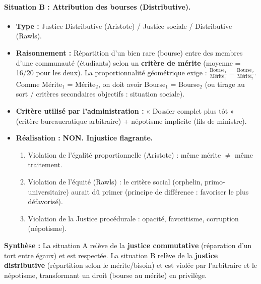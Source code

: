 \documentclass[11pt]{article}
\newcommand{\cle}[1]{{\popxbold\color{popdark}#1}}
\begin{document}
\begin{exoresolu}
    \paragraph{Situation B : Attribution des bourses (Distributive).}
    \begin{itemize}
        \item \textbf{Type :} \cle{Justice Distributive} (Aristote) / \cle{Justice sociale / Distributive} (Rawls).
        \item \textbf{Raisonnement :} Répartition d'un bien rare (bourse) entre des membres d'une communauté (étudiants) selon un \textbf{critère de mérite} (moyenne = 16/20 pour les deux). La proportionnalité géométrique exige : $\frac{\text{Bourse}_1}{\text{Mérite}_1} = \frac{\text{Bourse}_2}{\text{Mérite}_2}$. Comme Mérite$_1$ = Mérite$_2$, on doit avoir Bourse$_1$ = Bourse$_2$ (ou tirage au sort / critères secondaires objectifs : situation sociale).
        \item \textbf{Critère utilisé par l'administration :} « Dossier complet plus tôt » (critère bureaucratique arbitraire) + népotisme implicite (fils de ministre).
        \item \textbf{Réalisation :} \textbf{NON. Injustice flagrante.}
            \begin{enumerate}
                \item Violation de l'\cle{égalité proportionnelle} (Aristote) : même mérite $\neq$ même traitement.
                \item Violation de l'\cle{équité} (Rawls) : le critère social (orphelin, primo-universitaire) aurait dû primer (principe de différence : favoriser le plus défavorisé).
                \item Violation de la \cle{Justice procédurale} : opacité, favoritisme, corruption (népotisme).
            \end{enumerate}
    \end{itemize}
    \textbf{Synthèse :} La situation A relève de la \textbf{justice commutative} (réparation d'un tort entre égaux) et est respectée. La situation B relève de la \textbf{justice distributive} (répartition selon le mérite/bisoin) et est violée par l'arbitraire et le népotisme, transformant un droit (bourse au mérite) en privilège.
\end{exoresolu}
\end{document}
